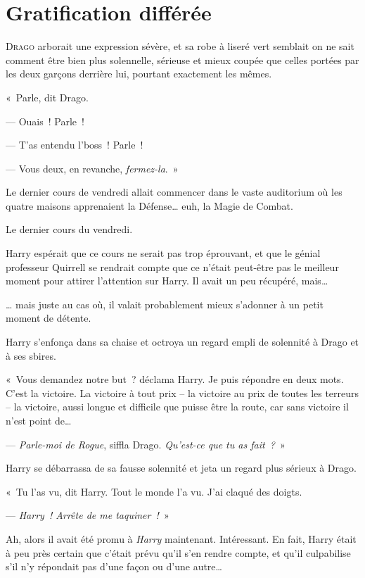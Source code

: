 
\chapter{Gratification différée}

\lettrine{D}{rago} arborait une expression sévère, et sa robe à liseré vert semblait on ne sait comment être bien plus solennelle, sérieuse et mieux coupée que celles portées par les deux garçons derrière lui, pourtant exactement les mêmes.

«~Parle, dit Drago.

--- Ouais~!
Parle~!

--- T'as entendu l'boss~!
Parle~!

--- Vous deux, en revanche, \emph{fermez-la}.~»

Le dernier cours de vendredi allait commencer dans le vaste auditorium où les quatre maisons apprenaient la Défense… euh, la Magie de Combat.

Le dernier cours du vendredi.

Harry espérait que ce cours ne serait pas trop éprouvant, et que le génial professeur Quirrell se rendrait compte que ce n'était peut-être pas le meilleur moment pour attirer l'attention sur Harry.
Il avait un peu récupéré, mais…

… mais juste au cas où, il valait probablement mieux s'adonner à un petit moment de détente.

Harry s'enfonça dans sa chaise et octroya un regard empli de solennité à Drago et à ses sbires.

«~Vous demandez notre but~? déclama Harry.
Je puis répondre en deux mots.
C'est la victoire.
La victoire à tout prix -- la victoire au prix de toutes les terreurs -- la victoire, aussi longue et difficile que puisse être la route, car sans victoire il n'est point de…

--- \emph{Parle-moi de Rogue}, siffla Drago.
\emph{Qu'est-ce que tu as fait~?}~»

Harry se débarrassa de sa fausse solennité et jeta un regard plus sérieux à Drago.

«~Tu l'as vu, dit Harry.
Tout le monde l'a vu.
J'ai claqué des doigts.

--- \emph{Harry~!
Arrête de me taquiner~!}~»

Ah, alors il avait été promu à \emph{Harry} maintenant.
Intéressant.
En fait, Harry était à peu près certain que c'était prévu qu'il s'en rendre compte, et qu'il culpabilise s'il n'y répondait pas d'une façon ou d'une autre…

